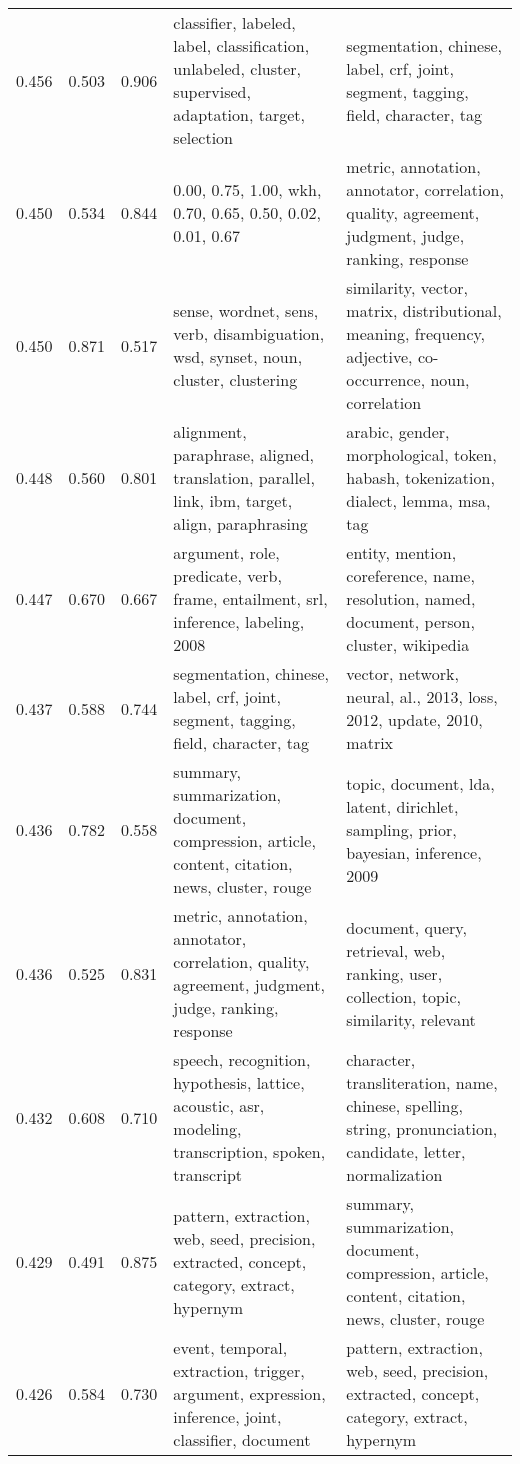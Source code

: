 \begin{tabular}{cccp{5cm}p{5cm}}
0.456 & 0.503 & 0.906 & classifier, labeled, label, classification, unlabeled, cluster, supervised, adaptation, target, selection & segmentation, chinese, label, crf, joint, segment, tagging, field, character, tag \\
0.450 & 0.534 & 0.844 & 0.00, 0.75, 1.00, wkh, 0.70, 0.65, 0.50, 0.02, 0.01, 0.67 & metric, annotation, annotator, correlation, quality, agreement, judgment, judge, ranking, response \\
0.450 & 0.871 & 0.517 & sense, wordnet, sens, verb, disambiguation, wsd, synset, noun, cluster, clustering & similarity, vector, matrix, distributional, meaning, frequency, adjective, co-occurrence, noun, correlation \\
0.448 & 0.560 & 0.801 & alignment, paraphrase, aligned, translation, parallel, link, ibm, target, align, paraphrasing & arabic, gender, morphological, token, habash, tokenization, dialect, lemma, msa, tag \\
0.447 & 0.670 & 0.667 & argument, role, predicate, verb, frame, entailment, srl, inference, labeling, 2008 & entity, mention, coreference, name, resolution, named, document, person, cluster, wikipedia \\
0.437 & 0.588 & 0.744 & segmentation, chinese, label, crf, joint, segment, tagging, field, character, tag & vector, network, neural, al., 2013, loss, 2012, update, 2010, matrix \\
0.436 & 0.782 & 0.558 & summary, summarization, document, compression, article, content, citation, news, cluster, rouge & topic, document, lda, latent, dirichlet, sampling, prior, bayesian, inference, 2009 \\
0.436 & 0.525 & 0.831 & metric, annotation, annotator, correlation, quality, agreement, judgment, judge, ranking, response & document, query, retrieval, web, ranking, user, collection, topic, similarity, relevant \\
0.432 & 0.608 & 0.710 & speech, recognition, hypothesis, lattice, acoustic, asr, modeling, transcription, spoken, transcript & character, transliteration, name, chinese, spelling, string, pronunciation, candidate, letter, normalization \\
0.429 & 0.491 & 0.875 & pattern, extraction, web, seed, precision, extracted, concept, category, extract, hypernym & summary, summarization, document, compression, article, content, citation, news, cluster, rouge \\
0.426 & 0.584 & 0.730 & event, temporal, extraction, trigger, argument, expression, inference, joint, classifier, document & pattern, extraction, web, seed, precision, extracted, concept, category, extract, hypernym \\

\end{tabular}
